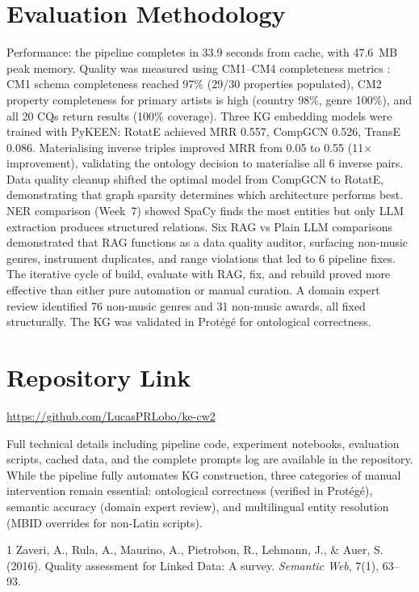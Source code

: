 \documentclass[11pt,a4paper]{article}
\begin{document}
\section{Evaluation Methodology}

Performance: the pipeline completes in 33.9 seconds from cache, with 47.6~MB peak memory. Quality was measured using CM1--CM4 completeness metrics \cite{zaveri2015}: CM1 schema completeness reached 97\% (29/30 properties populated), CM2 property completeness for primary artists is high (country 98\%, genre 100\%), and all 20 CQs return results (100\% coverage). Three KG embedding models were trained with PyKEEN: RotatE achieved MRR 0.557, CompGCN 0.526, TransE 0.086. Materialising inverse triples improved MRR from 0.05 to 0.55 (11$\times$ improvement), validating the ontology decision to materialise all 6 inverse pairs. Data quality cleanup shifted the optimal model from CompGCN to RotatE, demonstrating that graph sparsity determines which architecture performs best. NER comparison (Week~7) showed SpaCy finds the most entities but only LLM extraction produces structured relations. Six RAG vs Plain LLM comparisons demonstrated that RAG functions as a data quality auditor, surfacing non-music genres, instrument duplicates, and range violations that led to 6 pipeline fixes. The iterative cycle of build, evaluate with RAG, fix, and rebuild proved more effective than either pure automation or manual curation. A domain expert review identified 76 non-music genres and 31 non-music awards, all fixed structurally. The KG was validated in Prot\'{e}g\'{e} for ontological correctness.

\section{Repository Link}

\url{https://github.com/LucasPRLobo/ke-cw2}

Full technical details including pipeline code, experiment notebooks, evaluation scripts, cached data, and the complete prompts log are available in the repository. While the pipeline fully automates KG construction, three categories of manual intervention remain essential: ontological correctness (verified in Prot\'{e}g\'{e}), semantic accuracy (domain expert review), and multilingual entity resolution (MBID overrides for non-Latin scripts).

\begin{thebibliography}{1}
 Zaveri, A., Rula, A., Maurino, A., Pietrobon, R., Lehmann, J., \& Auer, S. (2016). Quality assessment for Linked Data: A survey. \textit{Semantic Web}, 7(1), 63--93.
\end{thebibliography}
\end{document}
